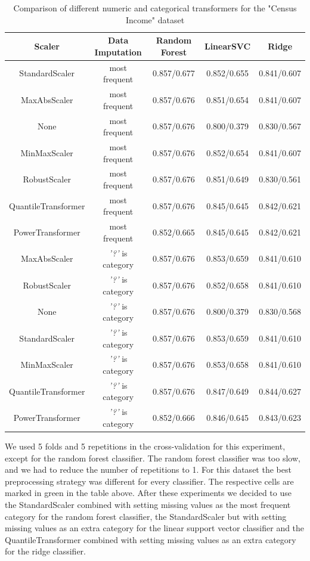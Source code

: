 \documentclass[a4paper,10pt]{article}
\begin{document}
\begin{table}[h!]
\centering
\small
\begin{tabular}{|c|c|c|c|c|}
\hline
\textbf{Scaler} & \textsf{Data Imputation} & \textbf{Random Forest} & \textbf{LinearSVC} & \textbf{Ridge} \\
\hline
StandardScaler & most frequent & \cellcolor[HTML]{C1E1C1}0.857/0.677 & 0.852/0.655 & 0.841/0.607 \\
\hline
MaxAbsScaler & most frequent & 0.857/0.676 & 0.851/0.654 & 0.841/0.607 \\
\hline
None & most frequent & 0.857/0.676 & 0.800/0.379 & 0.830/0.567 \\
\hline
MinMaxScaler & most frequent & 0.857/0.676 & 0.852/0.654 & 0.841/0.607 \\
\hline
RobustScaler & most frequent & 0.857/0.676 & 0.851/0.649 & 0.830/0.561 \\
\hline
QuantileTransformer & most frequent & 0.857/0.676 & 0.845/0.645 & 0.842/0.621 \\
\hline
PowerTransformer & most frequent & 0.852/0.665 & 0.845/0.645 & 0.842/0.621 \\
\hline
MaxAbsScaler & \textit{'?'} is category & 0.857/0.676 & 0.853/0.659 & 0.841/0.610 \\
\hline
RobustScaler & \textit{'?'} is category & 0.857/0.676 & 0.852/0.658 & 0.841/0.610 \\
\hline
None & \textit{'?'} is category & 0.857/0.676 & 0.800/0.379 & 0.830/0.568 \\
\hline
StandardScaler & \textit{'?'} is category & 0.857/0.676 & \cellcolor[HTML]{C1E1C1}0.853/0.659 & 0.841/0.610 \\
\hline
MinMaxScaler & \textit{'?'} is category & 0.857/0.676 & 0.853/0.658 & 0.841/0.610 \\
\hline
QuantileTransformer & \textit{'?'} is category & 0.857/0.676 & 0.847/0.649 & \cellcolor[HTML]{C1E1C1}0.844/0.627 \\
\hline
PowerTransformer & \textit{'?'} is category & 0.852/0.666 & 0.846/0.645 & 0.843/0.623 \\
\hline
\end{tabular}
\caption{Comparison of different numeric and categorical transformers for the "Census Income" dataset}
\label{table:censustransformers}
\end{table}
We used 5 folds and 5 repetitions in the cross-validation for this experiment, except for the random forest
classifier. The random forest classifier was too slow, and we had to reduce the number of repetitions to 1.
For this dataset the best
preprocessing strategy was different for every classifier. The respective cells are marked in green in the
table above. After these experiments we decided to use the StandardScaler combined with setting missing
values as the most frequent category for the random forest classifier, the StandardScaler but with setting
missing values as an extra category for the linear support vector classifier and the QuantileTransformer
combined with setting missing values as an extra category for the ridge classifier.
\end{document}
